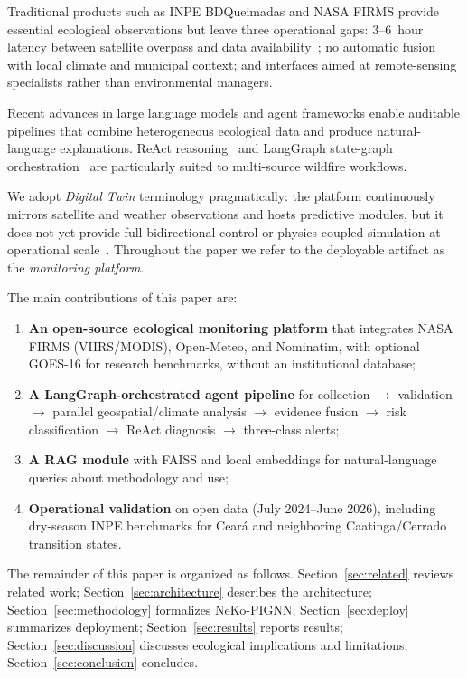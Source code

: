 \documentclass[preprint,12pt,times,numbers]{elsarticle}
\begin{document}
Traditional products such as INPE BDQueimadas and NASA FIRMS provide essential ecological observations but leave three operational gaps: 3--6~hour latency between satellite overpass and data availability~\cite{manual:firms2024}; no automatic fusion with local climate and municipal context; and interfaces aimed at remote-sensing specialists rather than environmental managers.

Recent advances in large language models and agent frameworks enable auditable pipelines that combine heterogeneous ecological data and produce natural-language explanations. ReAct reasoning~\cite{article:react2023} and LangGraph state-graph orchestration~\cite{manual:langgraph2024} are particularly suited to multi-source wildfire workflows.

We adopt \emph{Digital Twin} terminology pragmatically: the platform continuously mirrors satellite and weather observations and hosts predictive modules, but it does not yet provide full bidirectional control or physics-coupled simulation at operational scale~\cite{article:bauer2021natcc}. Throughout the paper we refer to the deployable artifact as the \emph{monitoring platform}.

The main contributions of this paper are:

\begin{enumerate}
    \item \textbf{An open-source ecological monitoring platform} that integrates NASA FIRMS (VIIRS/MODIS), Open-Meteo, and Nominatim, with optional GOES-16 for research benchmarks, without an institutional database;
    \item \textbf{A LangGraph-orchestrated agent pipeline} for collection $\rightarrow$ validation $\rightarrow$ parallel geospatial/climate analysis $\rightarrow$ evidence fusion $\rightarrow$ risk classification $\rightarrow$ ReAct diagnosis $\rightarrow$ three-class alerts;
    \item \textbf{A RAG module} with FAISS and local embeddings for natural-language queries about methodology and use;
    \item \textbf{Operational validation} on open data (July 2024--June 2026), including dry-season INPE benchmarks for Ceará and neighboring Caatinga/Cerrado transition states.
\end{enumerate}

The remainder of this paper is organized as follows. Section~\ref{sec:related} reviews related work; Section~\ref{sec:architecture} describes the architecture; Section~\ref{sec:methodology} formalizes NeKo-PIGNN; Section~\ref{sec:deploy} summarizes deployment; Section~\ref{sec:results} reports results; Section~\ref{sec:discussion} discusses ecological implications and limitations; Section~\ref{sec:conclusion} concludes.
\end{document}
